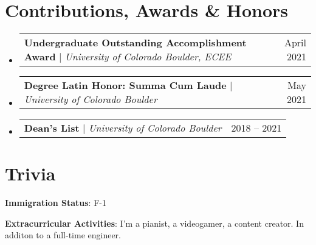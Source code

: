 \documentclass[letterpaper,11pt]{article}
\makeatletter
\newcommand{\resumeProjectHeading}[2]{
    \item
    \begin{tabular*}{0.97\textwidth}{l@{\extracolsep{\fill}}r}
      \small#1 & #2 \\
    \end{tabular*}\vspace{-7pt}
}
\newcommand{\resumeSubHeadingListStart}{\begin{itemize}[leftmargin=0.15in, label={}]}
\newcommand{\resumeSubHeadingListEnd}{\end{itemize}}
\makeatother
\begin{document}
 
\section{Contributions, Awards \& Honors}
  \resumeSubHeadingListStart
    \resumeProjectHeading
      {\textbf{Undergraduate Outstanding Accomplishment Award} $|$ \emph{University of Colorado Boulder, ECEE}}{April 2021}
    \resumeProjectHeading
      {\textbf{Degree Latin Honor: Summa Cum Laude} $|$ \emph{University of Colorado Boulder}}{May 2021}
    \resumeProjectHeading
      {\textbf{Dean's List} $|$ \emph{University of Colorado Boulder}}{2018 -- 2021}
  \resumeSubHeadingListEnd

  \vspace{1pt}

\section{Trivia}
 \begin{itemize}[leftmargin=0.15in, label={}]
  {
    \item{
      \textbf{Immigration Status}{: F-1}
    }
    \item{
      \textbf{Extracurricular Activities}{: I'm a pianist, a videogamer, a content creator. In additon to a full-time engineer.}
    }
  }
 \end{itemize}
\end{document}
